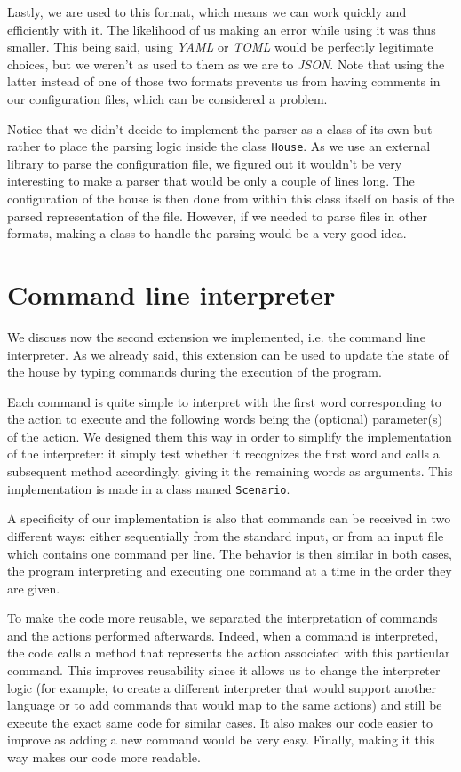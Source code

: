 		Lastly, we are used to this format, which means we can work quickly and efficiently with it. The likelihood of us making an error while using it was thus smaller. This being said, using \textit{YAML} or \textit{TOML} would be perfectly legitimate choices, but we weren't as used to them as we are to \textit{JSON}. Note that using the latter instead of one of those two formats prevents us from having comments in our configuration files, which can be considered a problem.
		
		Notice that we didn't decide to implement the parser as a class of its own but rather to place the parsing logic inside the class \texttt{House}. As we use an external library to parse the configuration file, we figured out it wouldn't be very interesting to make a parser that would be only a couple of lines long. The configuration of the house is then done from within this class itself on basis of the parsed representation of the file. However, if we needed to parse files in other formats, making a class to handle the parsing would be a very good idea.
	
	\section{Command line interpreter}
		We discuss now the second extension we implemented, i.e. the command line interpreter. As we already said, this extension can be used to update the state of the house by typing commands during the execution of the program.
		
		Each command is quite simple to interpret with the first word corresponding to the action to execute and the following words being the (optional) parameter(s) of the action. We designed them this way in order to simplify the implementation of the interpreter: it simply test whether it recognizes the first word and calls a subsequent method accordingly, giving it the remaining words as arguments. This implementation is made in a class named \texttt{Scenario}. 
		
		A specificity of our implementation is also that commands can be received in two different ways: either sequentially from the standard input, or from an input file which contains one command per line. The behavior is then similar in both cases, the program interpreting and executing one command at a time in the order they are given.
		
		To make the code more reusable, we separated the interpretation of commands and the actions performed afterwards. Indeed, when a command is interpreted, the code calls a method that represents the action associated with this particular command. This improves reusability since it allows us to change the interpreter logic (for example, to create a different interpreter that would support another language or to add commands that would map to the same actions) and still be execute the exact same code for similar cases. It also makes our code easier to improve as adding a new command would be very easy. Finally, making it this way makes our code more readable.

